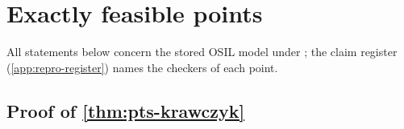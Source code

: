 \section{Exactly feasible points}\label{app:points}

All statements below concern the stored OSIL model under ; the claim register (\cref{app:repro-register}) names the checkers of each point.

\subsection{Proof of \texorpdfstring{\cref{thm:pts-krawczyk}}{the Krawczyk theorem}}\label{app:points-krawczyk}

